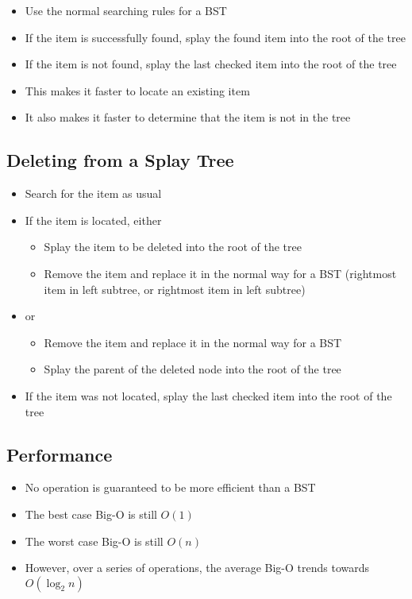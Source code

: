 \begin{itemize}
  \item Use the normal searching rules for a BST
  \item If the item is successfully found, splay the found item into the root of the tree
  \item If the item is not found, splay the last checked item into the root of the tree
  \item This makes it faster to locate an existing item
  \item It also makes it faster to determine that the item is not in the tree
\end{itemize}

\subsection*{Deleting from a Splay Tree}

\begin{itemize}
  \item Search for the item as usual
  \item If the item is located, either
  \begin{itemize}
    \item Splay the item to be deleted into the root of the tree
    \item Remove the item and replace it in the normal way for a BST (rightmost item in left subtree, or rightmost item in left subtree)
  \end{itemize}
  \item or
  \begin{itemize}
    \item Remove the item and replace it in the normal way for a BST
    \item Splay the parent of the deleted node into the root of the tree
  \end{itemize}
  \item If the item was not located, splay the last checked item into the root of the tree
\end{itemize}

\subsection*{Performance}

\begin{itemize}
  \item No operation is guaranteed to be more efficient than a BST
  \item The best case Big-O is still $O(1)$
  \item The worst case Big-O is still $O(n)$
  \item However, over a series of operations, the average Big-O trends towards $O(\log_2 n)$
\end{itemize}